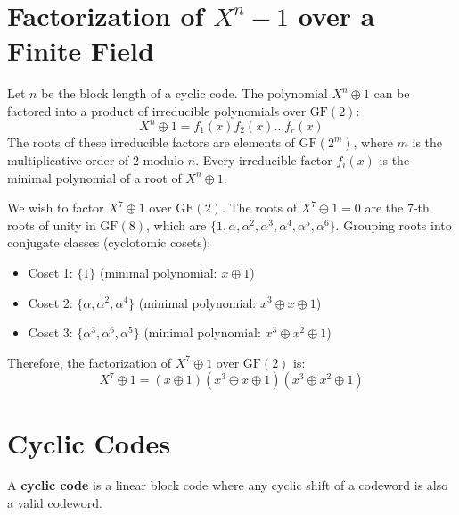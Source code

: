 \documentclass[12pt,a4paper]{article}
\begin{document}
\section{Factorization of \texorpdfstring{$X^n - 1$}{X^n - 1} over a Finite Field}

Let $n$ be the block length of a cyclic code. The polynomial $X^n \oplus 1$ can be factored into a product of irreducible polynomials over $\text{GF}(2)$:
\[ X^n \oplus 1 = f_1(x) f_2(x) \dots f_r(x) \]
The roots of these irreducible factors are elements of $\text{GF}(2^m)$, where $m$ is the multiplicative order of $2$ modulo $n$.
Every irreducible factor $f_i(x)$ is the minimal polynomial of a root of $X^n \oplus 1$.

\begin{tcolorbox}[examplebox, title={\textbf{Factorization Example for $n=7$}}]
We wish to factor $X^7 \oplus 1$ over $\text{GF}(2)$.
The roots of $X^7 \oplus 1 = 0$ are the 7-th roots of unity in $\text{GF}(8)$, which are $\{1, \alpha, \alpha^2, \alpha^3, \alpha^4, \alpha^5, \alpha^6\}$.
Grouping roots into conjugate classes (cyclotomic cosets):
\begin{itemize}[leftmargin=*, itemsep=2pt]
  \item Coset 1: $\{1\}$ (minimal polynomial: $x \oplus 1$)
  \item Coset 2: $\{\alpha, \alpha^2, \alpha^4\}$ (minimal polynomial: $x^3 \oplus x \oplus 1$)
  \item Coset 3: $\{\alpha^3, \alpha^6, \alpha^5\}$ (minimal polynomial: $x^3 \oplus x^2 \oplus 1$)
\end{itemize}
Therefore, the factorization of $X^7 \oplus 1$ over $\text{GF}(2)$ is:
\[ X^7 \oplus 1 = (x \oplus 1)(x^3 \oplus x \oplus 1)(x^3 \oplus x^2 \oplus 1) \]
\end{tcolorbox}

\section{Cyclic Codes}

A \textbf{cyclic code} is a linear block code where any cyclic shift of a codeword is also a valid codeword.
\end{document}
